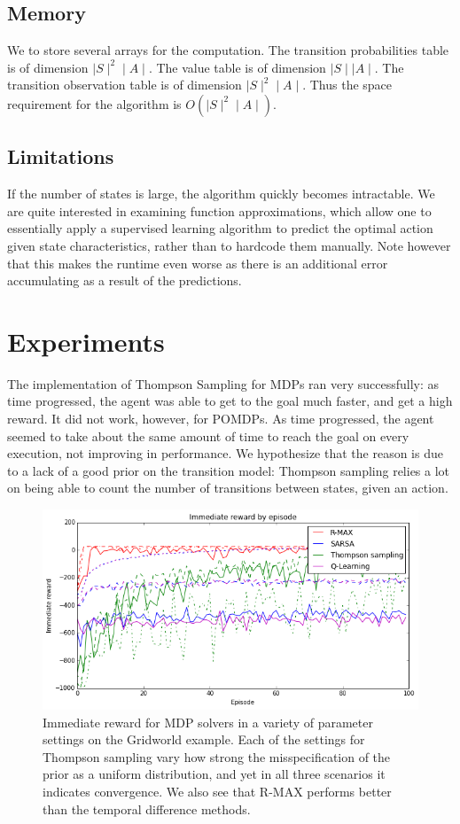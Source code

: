 \documentclass{pset}
\begin{document}
\subsection{Memory}
We to store several arrays for the computation. The transition probabilities
table is of dimension $\mid S \mid ^2 \mid A \mid$. The value table is of
dimension $\mid S \mid \mid A \mid$. The transition observation table is of
dimension $\mid S \mid ^2 \mid A \mid$. Thus the space requirement for the
algorithm is $O(\mid S \mid ^2 \mid A \mid)$.

\subsection{Limitations}
If the number of states is large, the algorithm quickly becomes intractable. We
are quite interested in examining function approximations, which allow one to
essentially apply a supervised learning algorithm to predict the optimal action
given state characteristics, rather than to hardcode them manually. Note
however that this makes the runtime even worse as there is an additional error
accumulating as a result of the predictions.

\section{Experiments}
The implementation of Thompson Sampling for MDPs ran very successfully: as time
progressed, the agent was able to get to the goal much faster, and get a high
reward. It did not work, however, for POMDPs. As time progressed, the agent seemed
to take about the same amount of time to reach the goal on every execution, not
improving in performance. We hypothesize that the reason is due to a lack of
a good prior on the transition model: Thompson sampling relies a lot on being
able to count the number of transitions between states, given an action.

\begin{figure}[ht]
\begin{center}
\centerline{\includegraphics[width=\textwidth]{img/mdp_imm_rewards.png}}
\caption{Immediate reward for MDP solvers in a variety of parameter settings on
the Gridworld example.
Each of the settings for Thompson sampling vary how strong the misspecification of the
prior as a uniform distribution, and yet in all three scenarios it indicates
convergence. We also see that R-MAX performs better than the temporal difference methods.}
\end{center}
\end{figure}
\end{document}
